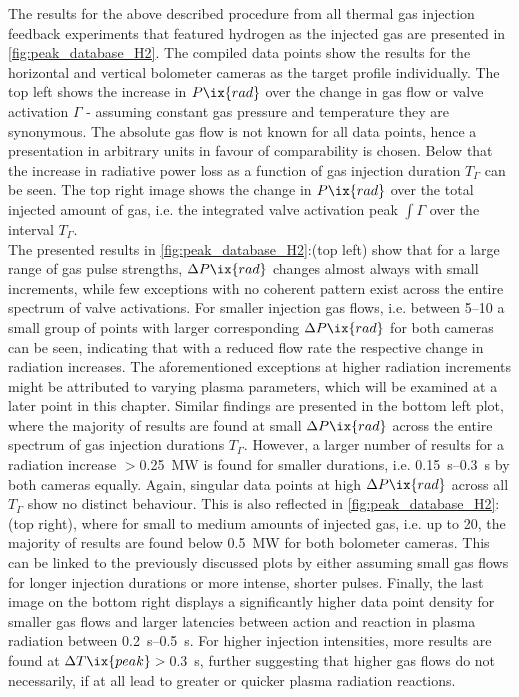 %
        The results for the above described procedure from all thermal gas injection feedback experiments that featured hydrogen as the injected gas are presented in \cref{fig:peak_database_H2}. The compiled data points show the results for the horizontal and vertical bolometer cameras as the target profile individually. The top left shows the increase in $P\ix{rad}$ over the change in gas flow or valve activation $\Gamma$ - assuming constant gas pressure and temperature they are synonymous. The absolute gas flow is not known for all data points, hence a presentation in arbitrary units in favour of comparability is chosen. Below that the increase in radiative power loss as a function of gas injection duration $T_{\Gamma}$ can be seen. The top right image shows the change in $P\ix{rad}$ over the total injected amount of gas, i.e. the integrated valve activation peak $\int\Gamma$ over the interval $T_{\Gamma}$.\\%
        The presented results in \cref{fig:peak_database_H2}:(top left) show that for a large range of gas pulse strengths, $\Delta P\ix{rad}$ changes almost always with small increments, while few exceptions with no coherent pattern exist across the entire spectrum of valve activations. For smaller injection gas flows, i.e. between \SIrange{5}{10}{\arbitraryunit} a small group of points with larger corresponding $\Delta P\ix{rad}$ for both cameras can be seen, indicating that with a reduced flow rate the respective change in radiation increases. The aforementioned exceptions at higher radiation increments might be attributed to varying plasma parameters, which will be examined at a later point in this chapter. Similar findings are presented in the bottom left plot, where the majority of results are found at small $\Delta P\ix{rad}$ across the entire spectrum of gas injection durations $T_{\Gamma}$. However, a larger number of results for a radiation increase $>$\SI{0.25}{\mega\watt} is found for smaller durations, i.e. \SIrange{0.15}{0.3}{\second} by both cameras equally. Again, singular data points at high $\Delta P\ix{rad}$ across all $T_{\Gamma}$ show no distinct behaviour. This is also reflected in \cref{fig:peak_database_H2}:(top right), where for small to medium amounts of injected gas, i.e. up to \SI{20}{\arbitraryunit}, the majority of results are found below \SI{0.5}{\mega\watt} for both bolometer cameras. This can be linked to the previously discussed plots by either assuming small gas flows for longer injection durations or more intense, shorter pulses. Finally, the last image on the bottom right displays a significantly higher data point density for smaller gas flows and larger latencies between action and reaction in plasma radiation between \SIrange{0.2}{0.5}{\second}. For higher injection intensities, more results are found at $\Delta T\ix{peak}>$\,\SI{0.3}{\second}, further suggesting that higher gas flows do not necessarily, if at all lead to greater or quicker plasma radiation reactions.\\%
